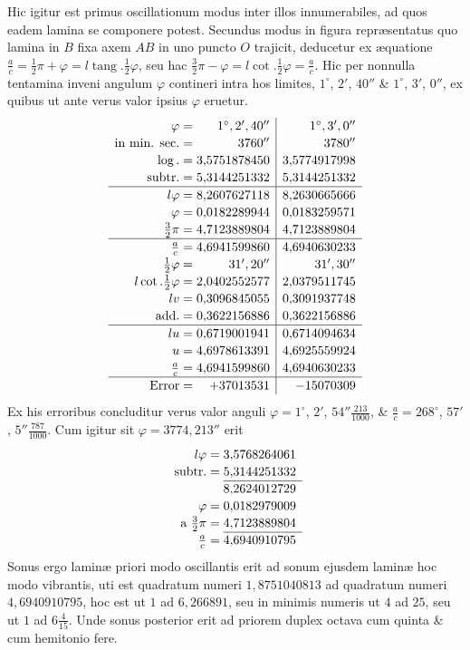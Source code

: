 Hic igitur est primus oscillationum modus inter illos innumerabiles, ad quos eadem lamina se componere potest. Secundus modus in figura repræsentatus quo lamina in $B$ fixa axem $AB$ in uno puncto $O$ trajicit, deducetur ex æquatione $\frac ac=\frac12\pi+\varphi=l\operatorname{tang}.\frac12\varphi$, seu hac $\frac32\pi-\varphi=l\cot.\frac12\varphi=\frac ac$. Hic per nonnulla tentamina inveni angulum $\varphi$ contineri intra hos limites, $1^\circ$, $2'$, $40''$ \& $1^\circ$, $3'$, $0''$, ex quibus ut ante verus valor ipsius $\varphi$ eruetur.
\[\renewcommand{\arraystretch}{1.13}\begin{array}{r@{\;=\;}r|r}
\varphi&1^\circ,2',40''&1^\circ,3',0''\\
\text{in min. sec.}&3760''&3780''\\
\log.&3{,}5751878450&3{,}5774917998\\
\text{subtr.}&5{,}3144251332&5{,}3144251332\\\hline
l\varphi&8{,}2607627118&8{,}2630665666\\
\varphi&0{,}0182289944&0{,}0183259571\\
\frac32\pi&4{,}7123889804&4{,}7123889804\\\hline
\frac ac&4{,}6941599860&4{,}6940630233\\
\frac12\varphi&31',20''&31',30''\\
l\cot.\frac12\varphi&2{,}0402552577&2{,}0379511745\\
lv&0{,}3096845055&0{,}3091937748\\
\text{add.}&0{,}3622156886&0{,}3622156886\\\hline
lu&0{,}6719001941&0{,}6714094634\\
u&4{,}6978613391&4{,}6925559924\\
\frac ac&4{,}6941599860&4{,}6940630233\\\hline
\text{Error}&+37013531&-15070309
\end{array}\]
Ex his erroribus concluditur verus valor anguli $\varphi=1^\circ$, $2'$, $54''\frac{213}{1000}$, \& $\frac ac=268^\circ$, $57'$, $5''\frac{787}{1000}$. Cum igitur sit $\varphi=3774{,}213''$ erit
\[\begin{array}{r@{\;=\;}r}
l\varphi&3{,}5768264061\\
\text{subtr.}&5{,}3144251332\\\cline{2-2}
\multicolumn{1}{r}{}&8{,}2624012729\\
\varphi&0{,}0182979009\\
\text{a }\frac32\pi&4{,}7123889804\\\cline{2-2}
\frac ac&4{,}6940910795
\end{array}\]
Sonus ergo laminæ priori modo oscillantis erit ad sonum ejusdem laminæ hoc modo vibrantis, uti est quadratum numeri $1{,}8751040813$ ad quadratum numeri $4{,}6940910795$, hoc est
ut $1$ ad $6{,}266891$, seu in minimis numeris ut $4$ ad $25$, seu ut $1$ ad $6\frac4{15}$. Unde sonus posterior erit ad priorem duplex octava cum quinta \& cum hemitonio fere.

